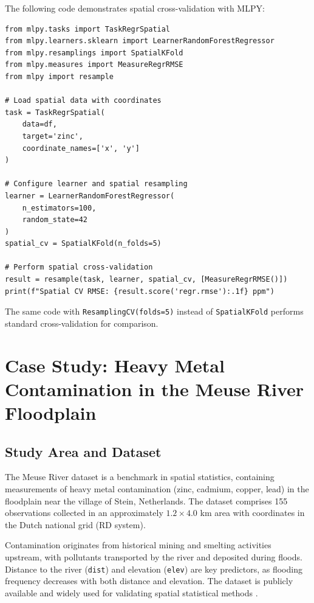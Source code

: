 \documentclass[review,12pt]{elsarticle}
\begin{document}
The following code demonstrates spatial cross-validation with MLPY:

\begin{verbatim}
from mlpy.tasks import TaskRegrSpatial
from mlpy.learners.sklearn import LearnerRandomForestRegressor
from mlpy.resamplings import SpatialKFold
from mlpy.measures import MeasureRegrRMSE
from mlpy import resample

# Load spatial data with coordinates
task = TaskRegrSpatial(
    data=df,
    target='zinc',
    coordinate_names=['x', 'y']
)

# Configure learner and spatial resampling
learner = LearnerRandomForestRegressor(
    n_estimators=100,
    random_state=42
)
spatial_cv = SpatialKFold(n_folds=5)

# Perform spatial cross-validation
result = resample(task, learner, spatial_cv, [MeasureRegrRMSE()])
print(f"Spatial CV RMSE: {result.score('regr.rmse'):.1f} ppm")
\end{verbatim}

The same code with \texttt{ResamplingCV(folds=5)} instead of \texttt{SpatialKFold} performs standard cross-validation for comparison.


\section{Case Study: Heavy Metal Contamination in the Meuse River Floodplain}\label{sec:case-study}

\subsection{Study Area and Dataset}

The Meuse River dataset \citep{rikken1996geostatistics} is a benchmark in spatial statistics, containing measurements of heavy metal contamination (zinc, cadmium, copper, lead) in the floodplain near the village of Stein, Netherlands. The dataset comprises 155 observations collected in an approximately $1.2 \times 4.0$ km area with coordinates in the Dutch national grid (RD system).

Contamination originates from historical mining and smelting activities upstream, with pollutants transported by the river and deposited during floods. Distance to the river (\texttt{dist}) and elevation (\texttt{elev}) are key predictors, as flooding frequency decreases with both distance and elevation. The dataset is publicly available and widely used for validating spatial statistical methods \citep{pebesma2004multivariable}.
\end{document}
